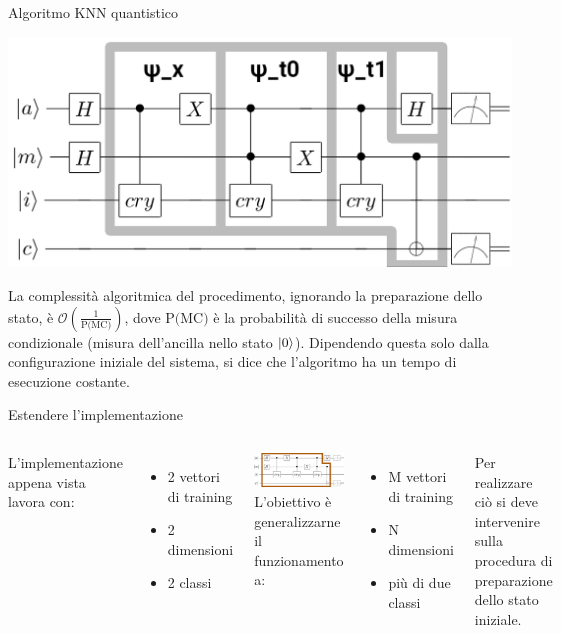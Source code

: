 \documentclass{beamer}
\begin{document}
    \begin{frame}{Algoritmo KNN quantistico}
        \begin{center}
            \includegraphics[width=.8\textwidth]{gfx/qknn_boxes.png}            
        \end{center}

        La complessità algoritmica del procedimento, ignorando la preparazione dello 
        stato, è $\mathcal{O}\left(\frac{1}{\text{P(MC)}}\right)$, 
        dove $\text{P(MC)}$ è la probabilità di successo della misura condizionale 
        (misura dell'ancilla nello stato $\ket{0}$). 
        Dipendendo questa solo dalla configurazione iniziale del sistema, si 
        dice che l'algoritmo ha un tempo di esecuzione costante. \cite{fingerhuth}
    \end{frame}

    \begin{frame}{Estendere l'implementazione}
        \begin{columns}[t]
            L'implementazione appena vista lavora con: 
            \begin{itemize}
                \item 2 vettori di training
                \item 2 dimensioni
                \item 2 classi
            \end{itemize}
            \vspace{.5cm}
            \includegraphics[width=.8\columnwidth]{gfx/qknn_preparazione_stato.png}
            L'obiettivo è generalizzarne il funzionamento a:
        \begin{itemize}
            \item M vettori di training
            \item N dimensioni
            \item più di due classi
        \end{itemize}
        \vspace{.5cm}
        Per realizzare ciò si deve intervenire sulla procedura di preparazione dello stato iniziale. 
        \end{columns}
    \end{frame}
\end{document}
